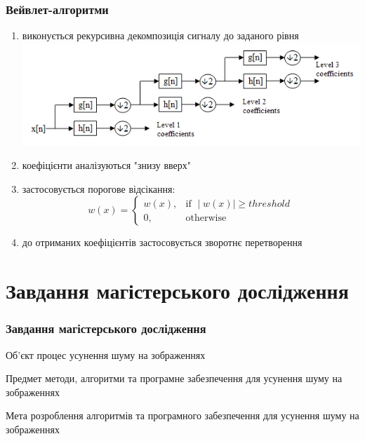 \documentclass[12pt]{beamer}
\begin{document}
\begin{frame}\frametitle{Вейвлет-алгоритми}
	\begin{enumerate}
		\item виконується рекурсивна декомпозиція сигналу до заданого рівня\linebreak
		\includegraphics[scale=0.3]{images/filter_bank} \linebreak
		\item коефіцієнти аналізуються "знизу вверх" 
		\item застосовується порогове відсікання: \linebreak
		\[
		w(x)= 
		\begin{cases}
		w(x),& \text{if } \mid{w(x)}\mid \geq threshold\\
		0,              & \text{otherwise}
		\end{cases}
		\]
		\item до отриманих коефіцієнтів застосовується зворотнє перетворення
	\end{enumerate}
\end{frame}

\section{Завдання магістерського дослідження}
\begin{frame}\frametitle{Завдання магістерського дослідження}
	\begin{block}{Об'єкт}
		процес усунення шуму на зображеннях
	\end{block}
	\begin{block}{Предмет}
		методи, алгоритми та програмне забезпечення для усунення шуму на зображеннях
	\end{block}
	\begin{block}{Мета}
		розроблення алгоритмів та програмного забезпечення для усунення шуму на зображеннях
	\end{block}
\end{frame}
\end{document}
